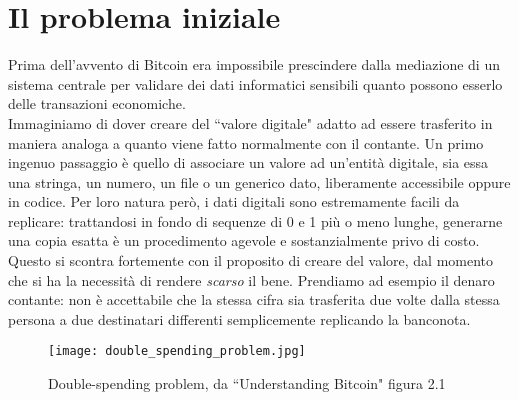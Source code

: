 \section{Il problema iniziale}
	Prima dell'avvento di Bitcoin era impossibile prescindere dalla mediazione di un sistema centrale per validare dei dati informatici sensibili quanto possono esserlo delle transazioni economiche. \\
	Immaginiamo di dover creare del ``valore digitale" adatto ad essere trasferito in maniera analoga a quanto viene fatto normalmente con il contante. Un primo ingenuo passaggio è quello di associare un valore ad un'entità digitale, sia essa una stringa, un numero, un file o un generico dato, liberamente accessibile oppure in codice. Per loro natura però, i dati digitali sono estremamente facili da replicare: trattandosi in fondo di sequenze di 0 e 1 più o meno lunghe, generarne una copia esatta è un procedimento agevole e sostanzialmente privo di costo. Questo si scontra fortemente con il proposito di creare del valore, dal momento che si ha la necessità di rendere \emph{scarso} il bene. Prendiamo ad esempio il denaro contante: non è accettabile che la stessa cifra sia trasferita due volte dalla stessa persona a due destinatari differenti semplicemente replicando la banconota.
	\begin{figure}[ht]
		\centering
		\texttt{[image: double\_spending\_problem.jpg]}
		\caption{Double-spending problem, da ``Understanding Bitcoin" \cite{understanding_bitcoin} figura 2.1}
		\label{fig:double-spending_img}
	\end{figure}

